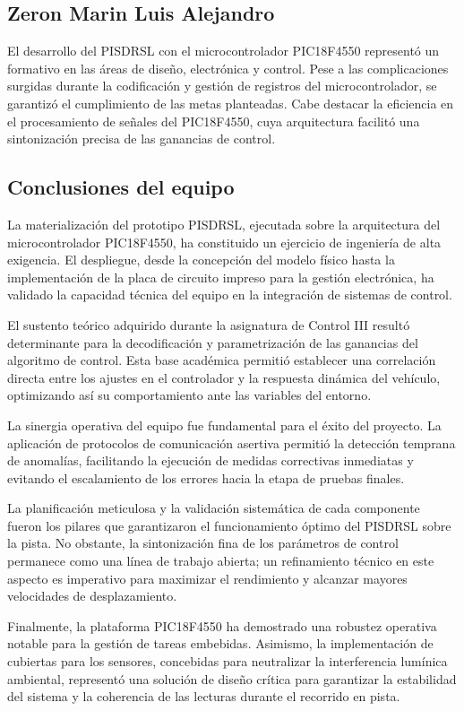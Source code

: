 \documentclass{article}
\begin{document}
\subsection{Zeron Marin Luis Alejandro}

El desarrollo del PISDRSL con el microcontrolador PIC18F4550 representó un  formativo en las áreas de diseño, electrónica y control. Pese a las complicaciones surgidas durante la codificación y gestión de registros del microcontrolador, se garantizó el cumplimiento de las metas planteadas. Cabe destacar la eficiencia en el procesamiento de señales del PIC18F4550, cuya arquitectura facilitó una sintonización precisa de las ganancias de control.

\subsection{Conclusiones del equipo}
La materialización del prototipo PISDRSL, ejecutada sobre la arquitectura del microcontrolador PIC18F4550, ha constituido un ejercicio de ingeniería de alta exigencia. El despliegue, desde la concepción del modelo físico hasta la implementación de la placa de circuito impreso para la gestión electrónica, ha validado la capacidad técnica del equipo en la integración de sistemas de control.

El sustento teórico adquirido durante la asignatura de Control III resultó determinante para la decodificación y parametrización de las ganancias del algoritmo de control. Esta base académica permitió establecer una correlación directa entre los ajustes en el controlador y la respuesta dinámica del vehículo, optimizando así su comportamiento ante las variables del entorno.

La sinergia operativa del equipo fue fundamental para el éxito del proyecto. La aplicación de protocolos de comunicación asertiva permitió la detección temprana de anomalías, facilitando la ejecución de medidas correctivas inmediatas y evitando el escalamiento de los errores hacia la etapa de pruebas finales.

La planificación meticulosa y la validación sistemática de cada componente fueron los pilares que garantizaron el funcionamiento óptimo del PISDRSL sobre la pista. No obstante, la sintonización fina de los parámetros de control permanece como una línea de trabajo abierta; un refinamiento técnico en este aspecto es imperativo para maximizar el rendimiento y alcanzar mayores velocidades de desplazamiento.

Finalmente, la plataforma PIC18F4550 ha demostrado una robustez operativa notable para la gestión de tareas embebidas. Asimismo, la implementación de cubiertas para los sensores, concebidas para neutralizar la interferencia lumínica ambiental, representó una solución de diseño crítica para garantizar la estabilidad del sistema y la coherencia de las lecturas durante el recorrido en pista.
\end{document}
